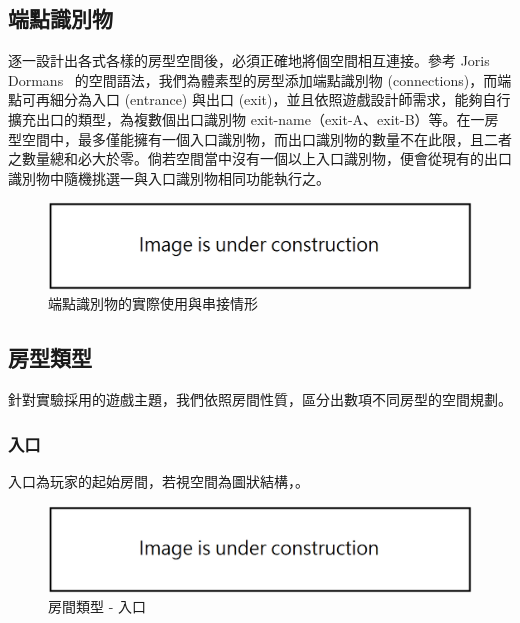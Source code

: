 \subsection{端點識別物}
\label{ssec:method-spacepieces-connections}

逐一設計出各式各樣的房型空間後，必須正確地將個空間相互連接。參考 Joris Dormans~\cite{dormans2010adventures} 的空間語法，我們為體素型的房型添加端點識別物 (connections)，而端點可再細分為入口 (entrance) 與出口 (exit)，並且依照遊戲設計師需求，能夠自行擴充出口的類型，為複數個出口識別物 exit-name（exit-A、exit-B）等。在一房型空間中，最多僅能擁有一個入口識別物，而出口識別物的數量不在此限，且二者之數量總和必大於零。倘若空間當中沒有一個以上入口識別物，便會從現有的出口識別物中隨機挑選一與入口識別物相同功能執行之。

\begin{figure}[h]
  \begin{center}
    \includegraphics[width=1.0\textwidth]{figures/under_construction.png}
    \caption{端點識別物的實際使用與串接情形} 
    \label{fig:connections-in-volume}
  \end{center}
\end{figure}

\subsection{房型類型}
\label{ssec:method-spacepieces-types}

針對實驗採用的遊戲主題，我們依照房間性質，區分出數項不同房型的空間規劃。

\subsubsection{入口}
\label{sssec:method-spacepieces-types-entrance}

入口為玩家的起始房間，若視空間為圖狀結構，。

\begin{figure}[h]
  \begin{center}
    \includegraphics[width=1.0\textwidth]{figures/under_construction.png}
    \caption{房間類型 - 入口}
    \label{fig:roomtype-entrance}
  \end{center}
\end{figure}

